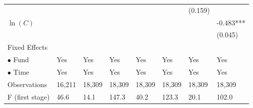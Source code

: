 \documentclass[openany]{book}
\theoremstyle{definition}
\theoremstyle{definition}
\theoremstyle{definition}
\theoremstyle{remark}
\begin{document}
\begin{table}[ht]
\begin{tabularx}{0.975\textwidth}{lYYYYYYY}
   &  &  &  &  &  & (0.159) &  \\ 
  $\ln(C)$ &  &  &  &  &  &  & -0.483*** \\ 
   &  &  &  &  &  &  & (0.045) \\ 
  Fixed Effects &  &  &  &  &  &  &  \\ 
  $\bullet$ Fund & Yes & Yes & Yes & Yes & Yes & Yes & Yes \\ 
  $\bullet$ Time & Yes & Yes & Yes & Yes & Yes & Yes & Yes \\ 
  Observations & 16,211 & 18,309 & 18,309 & 18,309 & 18,309 & 18,309 & 18,309 \\ 
  F (first stage) & 46.6 & 14.1 & 147.3 & 40.2 & 123.3 & 20.1 & 102.0 \\ 
   \bottomrule
\end{tabularx}
\endgroup
\end{table}


\end{document}
